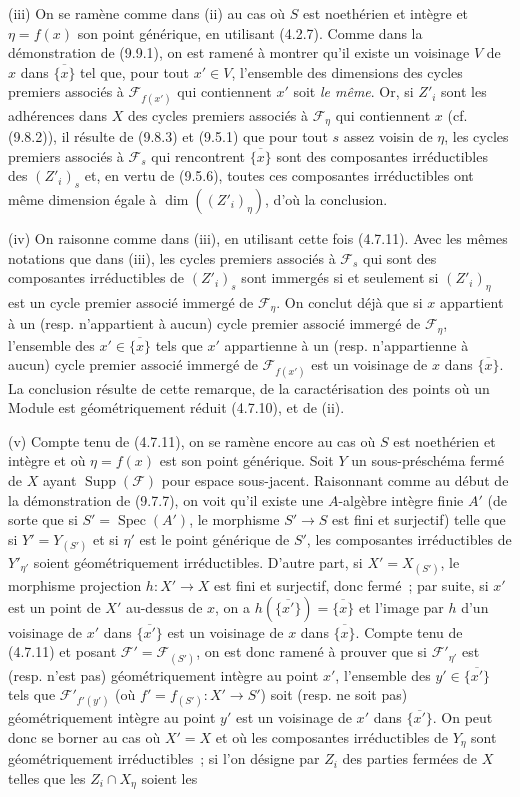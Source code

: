 (iii) On se ramène comme dans (ii) au cas où $S$ est noethérien et intègre et
$\eta=f(x)$ son point générique, en utilisant (4.2.7). Comme dans la
démonstration de (9.9.1), on est ramené à montrer qu'il existe un voisinage $V$
de $x$ dans $\overline{\{x\}}$ tel que, pour tout $x'\in V$, l'ensemble des
dimensions des cycles premiers associés à $\mathcal F_{f(x')}$ qui contiennent
$x'$ soit \emph{le même}. Or, si $Z'_i$ sont les adhérences dans $X$ des cycles
premiers associés à $\mathcal F_\eta$ qui contiennent $x$ (cf. (9.8.2)), il
résulte de (9.8.3) et (9.5.1) que pour tout $s$ assez voisin de $\eta$, les
cycles premiers associés à $\mathcal F_s$ qui rencontrent
$\overline{\{x\}}$ sont des composantes irréductibles des $(Z'_i)_s$ et, en
vertu de (9.5.6), toutes ces composantes irréductibles ont même dimension égale
à $\dim((Z'_i)_\eta)$, d'où la conclusion.

(iv) On raisonne comme dans (iii), en utilisant cette fois (4.7.11). Avec les
mêmes notations que dans (iii), les cycles premiers associés à $\mathcal F_s$
qui sont des composantes irréductibles de $(Z'_i)_s$ sont immergés si et
seulement si $(Z'_i)_\eta$ est un cycle premier associé immergé de
$\mathcal F_\eta$. On conclut déjà que si $x$ appartient à un (resp.
n'appartient à aucun) cycle premier associé immergé de $\mathcal F_\eta$,
l'ensemble des $x'\in\overline{\{x\}}$ tels que $x'$ appartienne à un (resp.
n'appartienne à aucun) cycle premier associé immergé de $\mathcal F_{f(x')}$
est un voisinage de $x$ dans $\overline{\{x\}}$. La conclusion résulte de cette
remarque, de la caractérisation des points où un Module est géométriquement
réduit (4.7.10), et de (ii).

(v) Compte tenu de (4.7.11), on se ramène encore au cas où $S$ est noethérien
et intègre et où $\eta=f(x)$ est son point générique. Soit $Y$ un
sous-préschéma fermé de $X$ ayant $\operatorname{Supp}(\mathcal F)$ pour espace
sous-jacent. Raisonnant comme au début de la démonstration de (9.7.7), on voit
qu'il existe une $A$-algèbre intègre finie $A'$ (de sorte que si
$S'=\operatorname{Spec}(A')$, le morphisme $S'\to S$ est fini et surjectif)
telle que si $Y'=Y_{(S')}$ et si $\eta'$ est le point générique de $S'$, les
composantes irréductibles de $Y'_{\eta'}$ soient géométriquement irréductibles.
D'autre part, si $X'=X_{(S')}$, le morphisme projection $h:X'\to X$ est fini
et surjectif, donc fermé~; par suite, si $x'$ est un point de $X'$ au-dessus de
$x$, on a $h(\overline{\{x'\}})=\overline{\{x\}}$ et l'image par $h$ d'un
voisinage de $x'$ dans $\overline{\{x'\}}$ est un voisinage de $x$ dans
$\overline{\{x\}}$. Compte tenu de (4.7.11) et posant
$\mathcal F'=\mathcal F_{(S')}$, on est donc ramené à prouver que si
$\mathcal F'_{\eta'}$ est (resp. n'est pas) géométriquement intègre au point
$x'$, l'ensemble des $y'\in\overline{\{x'\}}$ tels que
$\mathcal F'_{f'(y')}$ (où $f'=f_{(S')}:X'\to S'$) soit (resp. ne soit pas)
géométriquement intègre au point $y'$ est un voisinage de $x'$ dans
$\overline{\{x'\}}$. On peut donc se borner au cas où $X'=X$ et où les
composantes irréductibles de $Y_\eta$ sont géométriquement irréductibles~; si
l'on désigne par $Z_i$ des parties fermées de $X$ telles que les
$Z_i\cap X_\eta$ soient les

